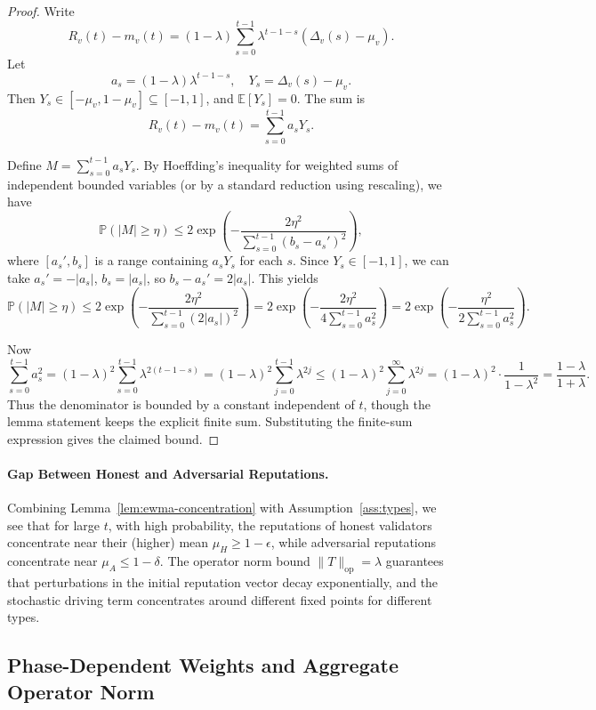 \documentclass[11pt]{article}
\theoremstyle{plain}
\theoremstyle{definition}
\begin{document}
\begin{proof}
Write
\[
R_v(t) - m_v(t) = (1-\lambda)\sum_{s=0}^{t-1} \lambda^{t-1-s}(\Delta_v(s) - \mu_v).
\]
Let
\[
a_s = (1-\lambda)\lambda^{t-1-s}, \quad Y_s = \Delta_v(s) - \mu_v.
\]
Then \(Y_s \in [-\mu_v,1-\mu_v] \subseteq [-1,1]\), and \(\mathbb{E}[Y_s] = 0\). The sum is
\[
R_v(t) - m_v(t) = \sum_{s=0}^{t-1} a_s Y_s.
\]

Define \(M = \sum_{s=0}^{t-1} a_s Y_s\). By Hoeffding's inequality for weighted sums of independent bounded variables (or by a standard reduction using rescaling), we have
\[
\mathbb{P}(|M| \ge \eta) \le 2\exp\left(-\frac{2\eta^2}{\sum_{s=0}^{t-1} (b_s - a_s')^2}\right),
\]
where \([a_s',b_s]\) is a range containing \(a_s Y_s\) for each \(s\). Since \(Y_s \in [-1,1]\), we can take \(a_s' = -|a_s|\), \(b_s = |a_s|\), so \(b_s - a_s' = 2|a_s|\). This yields
\[
\mathbb{P}(|M| \ge \eta)
\le 2\exp\left(-\frac{2\eta^2}{\sum_{s=0}^{t-1} (2|a_s|)^2}\right)
= 2\exp\left(-\frac{2\eta^2}{4\sum_{s=0}^{t-1} a_s^2}\right)
= 2\exp\left(-\frac{\eta^2}{2\sum_{s=0}^{t-1} a_s^2}\right).
\]

Now
\[
\sum_{s=0}^{t-1} a_s^2
= (1-\lambda)^2\sum_{s=0}^{t-1}\lambda^{2(t-1-s)}
= (1-\lambda)^2\sum_{j=0}^{t-1}\lambda^{2j}
\le (1-\lambda)^2\sum_{j=0}^{\infty}\lambda^{2j}
= (1-\lambda)^2\cdot \frac{1}{1-\lambda^2}
= \frac{1-\lambda}{1+\lambda}.
\]
Thus the denominator is bounded by a constant independent of \(t\), though the lemma statement keeps the explicit finite sum. Substituting the finite-sum expression gives the claimed bound.
\end{proof}

\paragraph{Gap Between Honest and Adversarial Reputations.}
Combining Lemma~\ref{lem:ewma-concentration} with Assumption~\ref{ass:types}, we see that for large \(t\), with high probability, the reputations of honest validators concentrate near their (higher) mean \(\mu_H \ge 1-\epsilon\), while adversarial reputations concentrate near \(\mu_A \le 1-\delta\). The operator norm bound \(\|T\|_{\mathrm{op}}=\lambda\) guarantees that perturbations in the initial reputation vector decay exponentially, and the stochastic driving term concentrates around different fixed points for different types.

\subsection{Phase-Dependent Weights and Aggregate Operator Norm}
\end{document}

